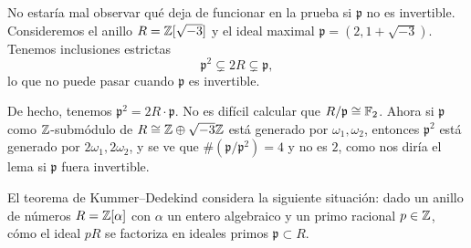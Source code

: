 \begin{comentario}
  No estaría mal observar qué deja de funcionar en la prueba si $\mathfrak{p}$
  no es invertible. Consideremos el anillo $R = \mathbb{Z} [\sqrt{-3}]$ y el ideal
  maximal $\mathfrak{p} = (2, 1 + \sqrt{-3})$. Tenemos inclusiones estrictas
  $$\mathfrak{p}^2 \subsetneq 2R \subsetneq \mathfrak{p},$$
  lo que no puede pasar cuando $\mathfrak{p}$ es invertible.

  De hecho, tenemos $\mathfrak{p}^2 = 2R\cdot \mathfrak{p}$. No es difícil
  calcular que $R/\mathfrak{p} \cong \mathbb{F}_2$. Ahora si $\mathfrak{p}$ como
  $\mathbb{Z}$-submódulo de $R \cong \mathbb{Z} \oplus \sqrt{-3}\mathbb{Z}$ está generado por
  $\omega_1, \omega_2$, entonces $\mathfrak{p}^2$ está generado por
  $2\omega_1, 2\omega_2$, y se ve que $\# (\mathfrak{p}/\mathfrak{p}^2) = 4$
  y no es $2$, como nos diría el lema si $\mathfrak{p}$ fuera invertible.
\end{comentario}

El teorema de Kummer--Dedekind considera la siguiente situación: dado un anillo
de números $R = \mathbb{Z} [\alpha]$ con $\alpha$ un entero algebraico y un primo
racional $p \in \mathbb{Z}$, cómo el ideal $pR$ se factoriza en ideales primos
$\mathfrak{p} \subset R$.

